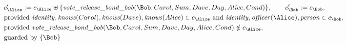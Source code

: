 \begin{align*}
&
c'_
{
\Alice
}
 := 
c_
{
\Alice
}
 \uplus 
\{
\mathit{\detokenize{
vote_release_bond_bob
}}
(
\Bob
,
Carol
,
Sum
,
Dave
,
Day
,
Alice
,
Cond
)
\}
, \qquad 
c'_
{
\Bob
}
 := 
c_
{
\Bob
}
,\\
&
\text{provided } 
\mathit{\detokenize{
identity
}}
,
\mathit{\detokenize{
knows
}}
(
Carol
)
,
\mathit{\detokenize{
knows
}}
(
Dave
)
,
\mathit{\detokenize{
knows
}}
(
Alice
)
 \in c_
{
\Alice
}
 \text{ and } 
\mathit{\detokenize{
identity
}}
,
\mathit{\detokenize{
officer
}}
(
\Alice
)
,
\mathit{\detokenize{
person
}}
 \in c_
{
\Bob
}
,\\
&
\text{provided } 
\mathit{\detokenize{
vote_release_bond_bob
}}
(
\Bob
,
Carol
,
Sum
,
Dave
,
Day
,
Alice
,
Cond
)
 \notin c_
{
\Alice
}
,\\
&
\text{guarded by } \{
\Bob
\}
\end{align*}

